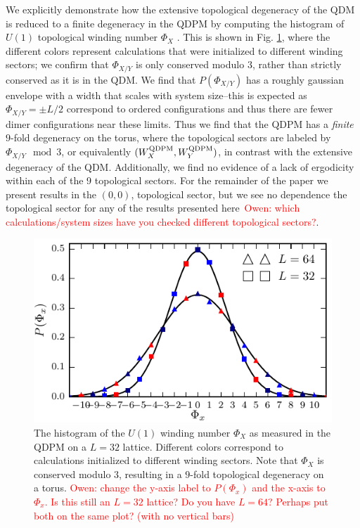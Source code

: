 \documentclass[twocolumn,prb,aps,floatfix,superscriptaddress]{revtex4-1}
\newcommand{\figref}[1]{Fig. \ref{#1}}
\newcommand{\note}[1]{\textcolor{red}{#1}}
\begin{document}
We explicitly demonstrate how the extensive topological degeneracy of the QDM is reduced to a finite degeneracy in the QDPM by computing the histogram of $U(1)$ topological winding number $\Phi_X$ . This is shown in \figref{fig:u1_wind_qdpm}, where the different colors represent calculations that were initialized to different winding sectors; we confirm that $\Phi_{X/Y}$ is only conserved modulo $3$, rather than strictly conserved as it is in the QDM. We find that $P(\Phi_{X/Y})$ has a roughly gaussian envelope with a width that scales with system size--this is expected as $\Phi_{X/Y} = \pm L/2$ correspond to ordered configurations and thus there are fewer dimer configurations near these limits. Thus we find that the QDPM has a \emph{finite} $9$-fold degeneracy on the torus, where the topological sectors are labeled by $\Phi_{X/Y} \mod 3$, or equivalently $(W_X^{\rm{QDPM}},W_Y^{\rm{QDPM}})$, in contrast with the extensive degeneracy of the QDM. Additionally, we find no evidence of a lack of ergodicity within each of the 9 topological sectors. For the remainder of the paper we present results in the $(0,0)$, topological sector, but we see no dependence the topological sector for any of the results presented here~\note{Owen: which calculations/system sizes have you checked different topological sectors?}.
\begin{figure}[]
    \centering
    \includegraphics[width=1.0\linewidth]{u1_wind_qdpm.pdf}
    \caption{The histogram of the $U(1)$ winding number $\Phi_X$ as measured in the QDPM on a
    $L=32$ lattice. Different colors correspond to calculations initialized to different winding sectors. Note that $\Phi_X$ is conserved modulo $3$, resulting in a $9$-fold topological degeneracy on a torus.
    \note{Owen: change the y-axis label to $P(\Phi_x)$ and the x-axis to $\Phi_x$. Is this still an $L=32$ lattice? Do you have $L=64$? Perhaps put both on the same plot? (with no vertical bars)}}
    \label{fig:u1_wind_qdpm}
\end{figure}
\end{document}
